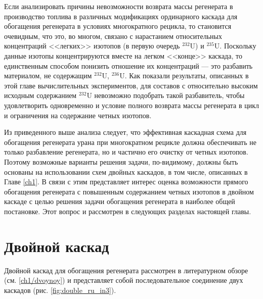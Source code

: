 Если анализировать причины невозможности возврата массы регенерата в производство топлива в различных модификациях ординарного каскада для обогащения регенерата в условиях многократного рецикла, то становится очевидным, что это, во многом, связано с нарастанием относительных концентраций <<легких>> изотопов (в первую очередь $^{232}$U) и $^{235}$U. Поскольку данные изотопы концентрируются вместе на легком <<конце>> каскада, то единственным способом понизить отношение их концентраций --- это разбавить материалом, не содержащим $^{232}$U, $^{236}$U. Как показали результаты, описанных в этой главе вычислительных экспериментов, для составов с относительно высоким исходным содержанием $^{232}$U невозможно подобрать такой разбавитель, чтобы удовлетворить одновременно и условие полного возврата массы регенерата в цикл и ограничения на содержание четных изотопов.

Из приведенного выше анализа следует, что эффективная каскадная схема для обогащения регенерата урана при многократном рецикле должна обеспечивать не только разбавление регенерата, но и частично его очистку от четных изотопов. Поэтому возможные варианты решения задачи, по-видимому, должны быть основаны на использовании схем двойных каскадов, в том числе, описанных в Главе \ref{ch1}. В связи с этим представляет интерес оценка возможности прямого обогащения регенерата с повышенным содержанием четных изотопов в двойном каскаде с целью решения задачи обогащения регенерата в наиболее общей постановке. Этот вопрос и рассмотрен в следующих разделах настоящей главы.

\section{Двойной каскад}\label{sec:ch2/dvoynoy}

Двойной каскад для обогащения регенерата рассмотрен в литературном обзоре (см. \ref{ch1/dvoynoy}) и представляет собой последовательное соединение двух каскадов (рис. \ref{fig:double_ru_in3}). 

